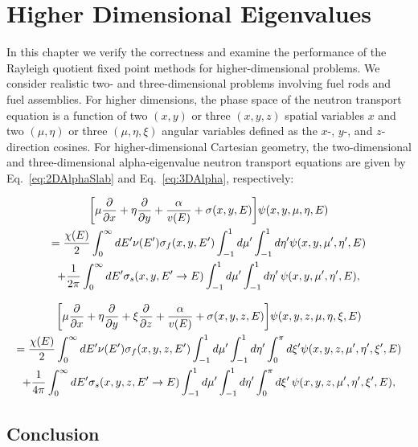 \chapter{Higher Dimensional Eigenvalues}

In this chapter we verify the correctness and examine the performance of the Rayleigh quotient fixed point methods for higher-dimensional problems. We consider realistic two- and three-dimensional problems involving fuel rods and fuel assemblies. For higher dimensions, the phase space of the neutron transport equation is a function of two $(x, y)$ or three $(x, y, z)$ spatial variables $x$ and two $(\mu, \eta)$ or three $(\mu, \eta, \xi)$ angular variables defined as the $x$-, $y$-, and $z$-direction cosines. For higher-dimensional Cartesian geometry, the two-dimensional and three-dimensional alpha-eigenvalue neutron transport equations are given by Eq.~\ref{eq:2DAlphaSlab} and Eq.~\ref{eq:3DAlpha}, respectively:

\begin{multline}
\bigg [ \mu \frac{\partial}{\partial x} + \eta \frac{\partial}{\partial y} + \frac{\alpha}{v(E)} + \sigma(x,y,E) \bigg ] \psi(x,y,\mu,\eta,E) \\ = \frac{\chi(E)}{2} \int_{0}^{\infty} \mathop{}\!d E' \nu(E') \sigma_{f}(x,y,E') \int_{-1}^{1} \mathop{}\!d \mu' \int_{-1}^{1} \mathop{}\!d \eta' \psi(x,y, \mu',\eta', E) \\ + \frac{1}{2\pi} \int_{0}^{\infty} \mathop{}\!d E' \sigma_{s}(x, y, E' \rightarrow E) \int_{-1}^{1} \mathop{}\!d \mu' \int_{-1}^{1} \mathop{}\!d \eta' \, \psi(x,y, \mu',\eta',E),
\label{eq:2DAlpha}
\end{multline}

\begin{multline}
\bigg [ \mu \frac{\partial}{\partial x} + \eta \frac{\partial}{\partial y} + \xi \frac{\partial}{\partial z} + \frac{\alpha}{v(E)} + \sigma(x,y,z,E) \bigg ] \psi(x,y,z,\mu,\eta,\xi, E) \\ = \frac{\chi(E)}{2} \int_{0}^{\infty} \diff E' \nu(E') \sigma_{f}(x,y,z,E') \int_{-1}^{1} \diff \mu' \int_{-1}^{1} \diff \eta' \int_{0}^{\pi} \diff \xi' \psi(x,y,z, \mu',\eta', \xi',E) \\ + \frac{1}{4\pi} \int_{0}^{\infty} \diff E' \sigma_{s}(x, y,z, E' \rightarrow E) \int_{-1}^{1} \diff \mu' \int_{-1}^{1} \diff \eta' \int_{0}^{\pi} \diff \xi' \, \psi(x,y,z, \mu',\eta',\xi',E),
\label{eq:3DAlpha}
\end{multline}


\section{Conclusion}
